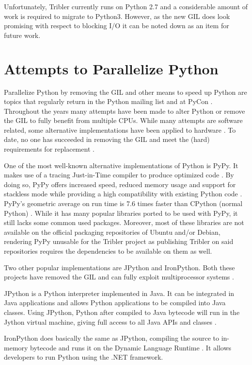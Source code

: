 Unfortunately, Tribler currently runs on Python 2.7 and a considerable amount of work is required to migrate to Python3.
However, as the new GIL does look promising with respect to blocking I/O it can be noted down as an item for future work.

\section{Attempts to Parallelize Python}
\label{sct:removing_the_gil}

Parallelize Python by removing the GIL and other means to speed up Python are topics that regularly return in the Python mailing list and at PyCon \cite{python2015global}.
Throughout the years many attempts have been made to alter Python or remove the GIL to fully benefit from multiple CPUs.
While many attempts are software related, some alternative implementations have been applied to hardware \cite{tabba2010adding}.
To date, no one has succeeded in removing the GIL and meet the (hard) requirements for replacement \cite{python2015global}.

One of the most well-known alternative implementations of Python is PyPy.
It makes use of a tracing Just-in-Time compiler to produce optimized code \cite{bolz2009tracing}.
By doing so, PyPy offers increased speed, reduced memory usage and support for stackless mode while providing a high compatibility with existing Python code \cite{pypy2016pypy}.
PyPy's geometric average on run time is 7.6 times faster than CPython (normal Python) \cite{pypy2016speed}.
While it has many popular libraries ported to be used with PyPy, it still lacks some common used packages.
Moreover, most of these libraries are not available on the official packaging repositories of Ubuntu and/or Debian, rendering PyPy unusable for the Tribler project as publishing Tribler on said repositories requires the dependencies to be available on them as well.

Two other popular implementations are JPython and IronPython.
Both these projects have removed the GIL and can fully exploit multiprocessor systems \cite{python2015global}.

JPython is a Python interpreter implemented in Java. It can be integrated in Java applications and allows Python applications to be compiled into Java classes.
Using JPython, Python after compiled to Java bytecode will run in the Jython virtual machine, giving full access to all Java APIs and classes \cite{jython2016why}.

IronPython does basically the same as JPython, compiling the source to in-memory bytecode and runs it on the Dynamic Language Runtime \cite{ironpython2014}.
It allows developers to run Python using the .NET framework.

